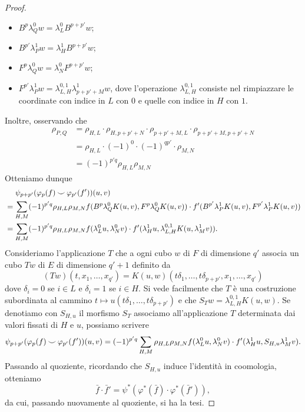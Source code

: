 \begin{proof}
\begin{itemize}
\item $B^p\lambda^0_Qw=\lambda^0_LB^{p+p'}w$;
\item $B^{p'}\lambda^1_Pw=\lambda^1_HB^{p+p'}w$;
\item $F^p\lambda^0_Qw=\lambda^0_NF^{p+p'}w$;
\item $F^{p'}\lambda^1_Pw=\lambda^{0,1}_{L,H}\lambda^1_{p+p'+M}w$, dove l'operazione $\lambda^{0,1}_{L,H}$ consiste nel rimpiazzare le coordinate con indice in $L$ con $0$ e quelle con indice in $H$ con $1$.
\end{itemize}
Inoltre, osservando che
\begin{align*}
\rho_{P,Q}&=\rho_{H,L}\cdot\rho_{H,p+p'+N}\cdot\rho_{p+p'+M,L}\cdot\rho_{p+p'+M,p+p'+N}\\
&=\rho_{H,L}\cdot (-1)^0\cdot(-1)^{qp'}\cdot\rho_{M,N}\\
&=(-1)^{p'q}\rho_{H,L}\rho_{M,N} 
\end{align*}
Otteniamo dunque
\begin{align*}
&\phantomop\psi_{p+p'}(\varphi_p(f)\cupp\varphi_{p'}(f'))(u,v)\\
&=\sum_{H,M}(-1)^{p'q}\rho_{H,L}\rho_{M,N} f(B^p\lambda^0_QK(u,v),F^p\lambda^0_QK(u,v))\cdot f'(B^{p'}\lambda^1_PK(u,v),F^{p'}\lambda^1_PK(u,v))\\
&=\sum_{H,M}(-1)^{p'q}\rho_{H,L}\rho_{M,N}f(\lambda^0_Lu,\lambda^0_Nv)\cdot f'(\lambda^1_Hu,\lambda^{0,1}_{L,H}K(u,\lambda^1_Mv)).
\end{align*}
Consideriamo l'applicazione $T$ che a ogni cubo $w$ di $F$ di dimensione $q'$ associa un cubo $Tw$ di $E$ di dimensione $q'+1$ definito da
$$
(Tw)(t,x_1,\ldots,x_{q'})=K(u,w)(t\delta_1,\ldots,t\delta_{p+p'},x_1,\ldots,x_{q'})
$$
dove $\delta_i=0$ se $i\in L$ e $\delta_i=1$ se $i\in H$. Si vede facilmente che $T$ è una costruzione subordinata al cammino $t\mapsto u(t\delta_1,\ldots,t\delta_{p+p'})$ e che $S_Tw=\lambda^{0,1}_{L,H}K(u,w)$. Se denotiamo con $S_{H,u}$ il morfismo $S_T$ associamo all'applicazione $T$ determinata dai valori fissati di $H$ e $u$, possiamo scrivere
$$
\psi_{p+p'}(\varphi_p(f)\mathbin{\smile}\varphi_{p'}(f'))(u,v)=(-1)^{p'q}\sum_{H,M}\rho_{H,L}\rho_{M,N}f(\lambda^0_Lu,\lambda^0_Nv)\cdot f'(\lambda^1_Hu,S_{H,u}\lambda^1_Mv).
$$
Passando al quoziente, ricordando che $S_{H,u}$ induce l'identità in coomologia, otteniamo
$$
\bar{f}\cdot\bar{f}'=\psi^*(\varphi^*(\bar{f})\cdot\varphi^*(\bar{f}')),
$$
da cui, passando nuovamente al quoziente, si ha la tesi.
\end{proof}

